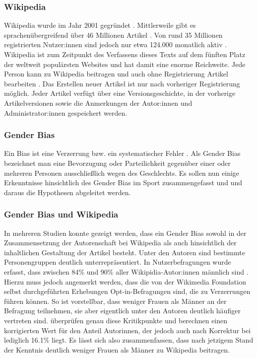 \documentclass[11pt]{article}
\begin{document}
\subsubsection*{Wikipedia}
Wikipedia wurde im Jahr 2001 gegründet \parencite{wikipediaTimeline}. Mittlerweile gibt es sprachenübergreifend über 46 Millionen Artikel \parencite{wikipedia_Size}. Von rund 35 Millionen registrierten Nutzer:innen sind jedoch nur etwa 124.000 monatlich aktiv \parencite{wikipedians}. 
Wikipedia ist zum Zeitpunkt des Verfassens dieses Texts auf dem fünften Platz der weltweit populärsten Websites \parencite{Alexa2019} und hat damit eine enorme Reichweite.
Jede Person kann zu Wikipedia beitragen und auch ohne Registrierung Artikel bearbeiten \parencite{wikipediaTutorial}. Das Erstellen neuer Artikel ist nur nach vorheriger Registrierung möglich. Jeder Artikel verfügt über eine Versionsgeschichte, in der vorherige Artikelversionen sowie die Anmerkungen der Autor:innen und Administrator:innen gespeichert werden.

\subsubsection*{Gender Bias}

Ein Bias ist eine Verzerrung bzw. ein systematischer Fehler \parencite{Wirtz}. Als Gender Bias bezeichnet man eine Bevorzugung oder Parteilichkeit gegenüber einer oder mehreren Personen ausschließlich wegen des Geschlechts. Es sollen nun einige Erkenntnisse hinsichtlich des Gender Bias im Sport zusammengefasst und und daraus die Hypothesen abgeleitet werden.

\subsubsection{Gender Bias und Wikipedia}
In mehreren Studien konnte gezeigt werden, dass ein Gender Bias sowohl in der Zusammensetzung der Autorenschaft bei Wikipedia als auch hinsichtlich der inhaltlichen Gestaltung der Artikel besteht. 
Unter den Autoren sind bestimmte Personengruppen deutlich unterrepräsentiert. In Nutzerbefragungen wurde erfasst, dass zwischen 84\% und 90\% aller Wikipidia-Autor:innen männlich sind \parencite{wikimediaReport,GraellsGarrido2015}. Hierzu muss jedoch angemerkt werden, dass die von der Wikimedia Foundation selbst durchgeführten Erhebungen Opt-in-Befragungen sind, die zu Verzerrungen führen können. So ist vorstellbar, dass weniger Frauen als Männer an der Befragung teilnehmen, sie aber eigentlich unter den Autoren deutlich häufiger vertreten sind. \textcite{Hill2013} überprüfen genau diese Kritikpunkte und berechnen einen korrigierten Wert für den Anteil Autorinnen, der jedoch auch nach Korrektur bei lediglich 16.1\% liegt. Es lässt sich also zusammenfassen, dass nach jetzigem Stand der Kenntnis deutlich weniger Frauen als Männer zu Wikipedia beitragen.
\end{document}
